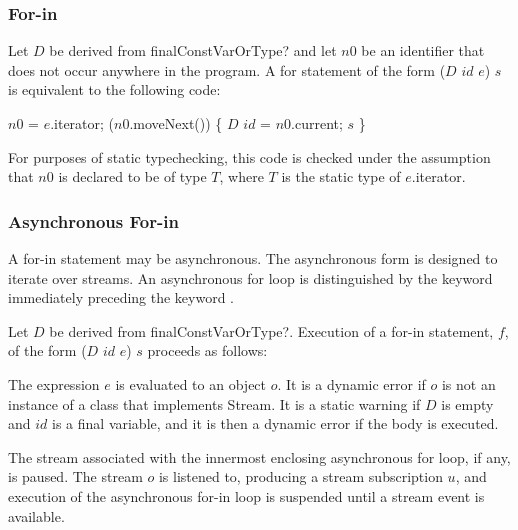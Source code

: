 \documentclass{article}
\newcommand{\code}[1]{{\sf #1}}
\begin{document}

\subsubsection{For-in}

\LMHash{}
Let $D$ be derived from \code{finalConstVarOrType?}
and let $n0$ be an identifier that does not occur anywhere in the program.
A for statement of the form \code{\FOR{} ($D$ $id$ \IN{} $e$) $s$} is equivalent to the following code:

\begin{dartCode}
\VAR{} $n0$ = $e$.iterator;
\WHILE{} ($n0$.moveNext()) \{
   $D$ $id$ = $n0$.current;
   $s$
\}
\end{dartCode}

For purposes of static typechecking,
this code is checked under the assumption that $n0$ is declared to be of type $T$,
where $T$ is the static type of \code{$e$.iterator}.


\subsubsection{Asynchronous For-in}

\LMHash{}
A for-in statement may be asynchronous. The asynchronous form is designed to iterate over streams. An asynchronous for loop is distinguished by the keyword \AWAIT{} immediately preceding the keyword \FOR.

\LMHash{}
Let $D$ be derived from \code{finalConstVarOrType?}.
Execution of a for-in statement, $f$, of the form
\code{\AWAIT{} \FOR{} ($D$ $id$ \IN{} $e$) $s$}
proceeds as follows:

\LMHash{}
The expression $e$ is evaluated to an object $o$.
It is a dynamic error if $o$ is not an instance of a class that implements \code{Stream}.
It is a static warning if $D$ is empty and $id$ is a final variable,
and it is then a dynamic error if the body is executed.

\LMHash{}
The stream associated with the innermost enclosing asynchronous for loop, if any, is paused.
The stream $o$ is listened to, producing a stream subscription $u$,
and execution of the asynchronous for-in loop is suspended
until a stream event is available.
\end{document}
